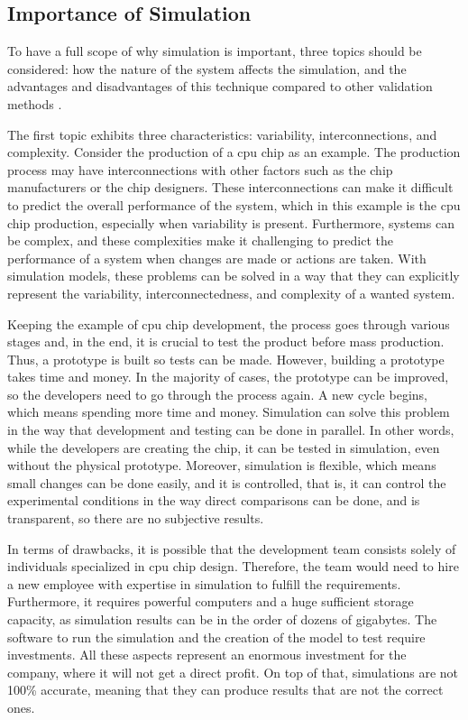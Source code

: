 \subsection{Importance of Simulation}

To have a full scope of why simulation is important, three topics should be considered: how the nature of the system affects the simulation, and the advantages and disadvantages of this technique compared to other validation methods \cite{SimulationBook}.

The first topic exhibits three characteristics: variability, interconnections, and complexity. Consider the production of a \gls{cpu} chip as an example. The production process may have interconnections with other factors such as the chip manufacturers or the chip designers. These interconnections can make it difficult to predict the overall performance of the system, which in this example is the \gls{cpu} chip production, especially when variability is present. Furthermore, systems can be complex, and these complexities make it challenging to predict the performance of a system when changes are made or actions are taken. With simulation models, these problems can be solved in a way that they can explicitly represent the variability, interconnectedness, and complexity of a wanted system.

Keeping the example of \gls{cpu} chip development, the process goes through various stages and, in the end, it is crucial to test the product before mass production. Thus, a prototype is built so tests can be made. However, building a prototype takes time and money. In the majority of cases, the prototype can be improved, so the developers need to go through the process again. A new cycle begins, which means spending more time and money. Simulation can solve this problem in the way that development and testing can be done in parallel. In other words, while the developers are creating the chip, it can be tested in simulation, even without the physical prototype. Moreover, simulation is flexible, which means small changes can be done easily, and it is controlled, that is, it can control the experimental conditions in the way direct comparisons can be done, and is transparent, so there are no subjective results.

In terms of drawbacks, it is possible that the development team consists solely of individuals specialized in \gls{cpu} chip design. Therefore, the team would need to hire a new employee with expertise in simulation to fulfill the requirements. Furthermore, it requires powerful computers and a huge sufficient storage capacity, as simulation results can be in the order of dozens of gigabytes. The software to run the simulation and the creation of the model to test require investments. All these aspects represent an enormous investment for the company, where it will not get a direct profit. On top of that, simulations are not 100\% accurate, meaning that they can produce results that are not the correct ones.

